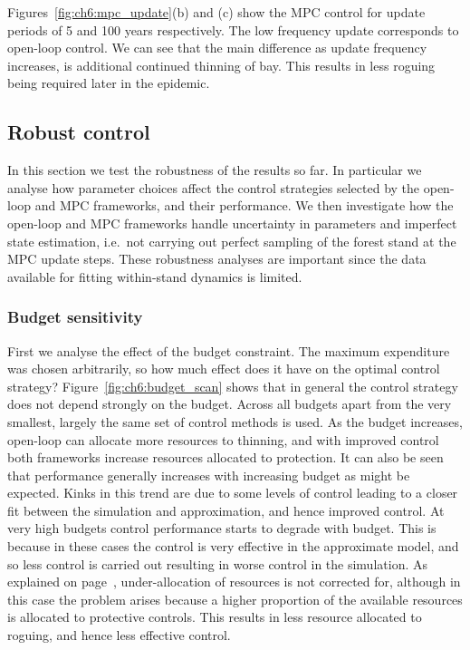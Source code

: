 Figures~\ref{fig:ch6:mpc_update}(b) and (c) show the MPC control for update periods of 5 and 100 years respectively. The low frequency update corresponds to open-loop control. We can see that the main difference as update frequency increases, is additional continued thinning of bay. This results in less roguing being required later in the epidemic.

\FloatBarrier
\subsection{Robust control}\label{sec:ch6:robust}

In this section we test the robustness of the results so far. In particular we analyse how parameter choices affect the control strategies selected by the open-loop and MPC frameworks, and their performance. We then investigate how the open-loop and MPC frameworks handle uncertainty in parameters and imperfect state estimation, i.e.\ not carrying out perfect sampling of the forest stand at the MPC update steps. These robustness analyses are important since the data available for fitting within-stand dynamics is limited.

\subsubsection{Budget sensitivity}

First we analyse the effect of the budget constraint. The maximum expenditure was chosen arbitrarily, so how much effect does it have on the optimal control strategy? Figure~\ref{fig:ch6:budget_scan} shows that in general the control strategy does not depend strongly on the budget. Across all budgets apart from the very smallest, largely the same set of control methods is used. As the budget increases, open-loop can allocate more resources to thinning, and with improved control both frameworks increase resources allocated to protection. It can also be seen that performance generally increases with increasing budget as might be expected. Kinks in this trend are due to some levels of control leading to a closer fit between the simulation and approximation, and hence improved control. At very high budgets control performance starts to degrade with budget. This is because in these cases the control is very effective in the approximate model, and so less control is carried out resulting in worse control in the simulation. As explained on page~\pageref{sec:ch6:lifting}, under-allocation of resources is not corrected for, although in this case the problem arises because a higher proportion of the available resources is allocated to protective controls. This results in less resource allocated to roguing, and hence less effective control.

